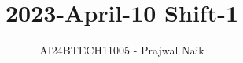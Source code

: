 \documentclass[journal]{IEEEtran}
\begin{document}

\vspace{3cm}

\title{2023-April-10 Shift-1}
\author{AI24BTECH11005 - Prajwal Naik}
{\let\newpage\relax\maketitle}

\renewcommand{\thefigure}{\theenumi}
\renewcommand{\thetable}{\theenumi}
\setlength{\intextsep}{10pt} %


\renewcommand{\thetable}{\theenumi}
\end{document}
